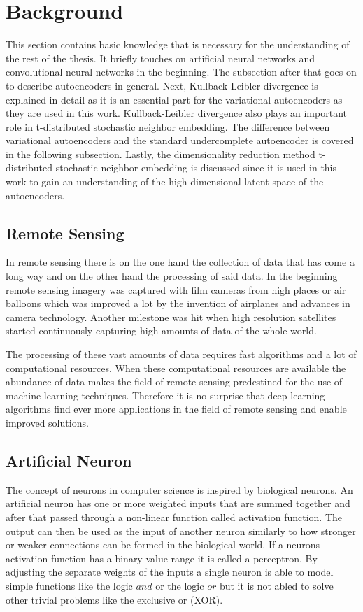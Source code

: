 \section{Background}

This section contains basic knowledge that is necessary for the understanding of the rest of the thesis.
It briefly touches on artificial neural networks and convolutional neural networks in the beginning.
The subsection after that goes on to describe autoencoders in general. Next, Kullback-Leibler divergence
is explained in detail as it is an essential part for the variational autoencoders as they are used in this
work. Kullback-Leibler divergence also plays an important role in t-distributed stochastic neighbor embedding.
The difference between variational autoencoders and the standard undercomplete autoencoder is covered in the 
following subsection. Lastly, the dimensionality reduction method 
t-distributed stochastic neighbor embedding is discussed since it is used in this work to gain an 
understanding of the high dimensional latent space of the autoencoders.

\subsection{Remote Sensing}

In remote sensing there is on the one hand the collection of data that has come a long way and on the other hand
the processing of said data. In the beginning remote sensing imagery was captured with film cameras from
high places or air balloons which was improved a lot by the invention of airplanes and advances in camera
technology. Another milestone was hit when high resolution satellites started continuously capturing 
high amounts of data of the whole world.

The processing of these vast amounts of data requires fast algorithms and a lot of computational resources.
When these computational resources are available the abundance of data makes the field of remote sensing
predestined for the use of machine learning techniques. Therefore it is no surprise that deep learning
algorithms find ever more applications in the field of remote sensing and enable improved solutions.

\subsection{Artificial Neuron}

The concept of neurons in computer science is inspired by biological neurons. An artificial neuron has one or
more weighted inputs that are summed together
and after that passed through a non-linear function called activation function. 
The output can then be used as
the input of another neuron similarly to how stronger or weaker connections can be formed in the biological
world.
If a neurons activation function has a binary value range it is called a perceptron.
By adjusting the separate weights of the inputs a single neuron is able to model
simple functions like the logic $and$ or the logic $or$ but it is not abled to solve other trivial problems
like the exclusive or (XOR).

